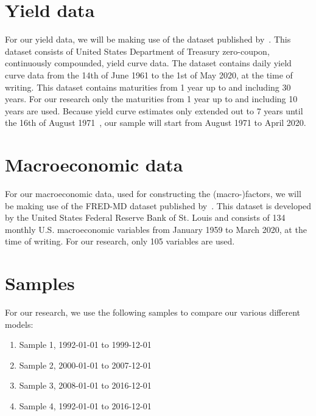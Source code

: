 \section{Yield data}
For our yield data, we will be making use of the dataset published by~\textcite{Grkaynak2007}. 
This dataset consists of United States Department of Treasury zero-coupon, continuously compounded, yield curve data. 
The dataset contains daily yield curve data from the 14th of June 1961 to the 1st of May 2020, at the time of writing. 
This dataset contains maturities from 1 year up to and including 30 years. 
For our research only the maturities from 1 year up to and including 10 years are used. 
Because yield curve estimates only extended out to 7 years until the 16th of August 1971~\parencite[see][p.~19]{Grkaynak2007}, our sample will start from August 1971 to April 2020. 

\section{Macroeconomic data}
For our macroeconomic data, used for constructing the (macro-)factors, we will be making use of the FRED-MD dataset published by~\textcite{McCracken2016}. 
This dataset is developed by the United States Federal Reserve Bank of St. Louis and consists of 134 monthly U.S. macroeconomic variables from January 1959 to March 2020, at the time of writing. 
For our research, only 105 variables are used.

\section{Samples}
For our research, we use the following samples to compare our various different models:
\begin{enumerate}
	\item Sample 1, 1992-01-01 to 1999-12-01
	\item Sample 2, 2000-01-01 to 2007-12-01
	\item Sample 3, 2008-01-01 to 2016-12-01
	\item Sample 4, 1992-01-01 to 2016-12-01
\end{enumerate}